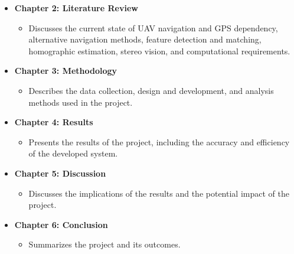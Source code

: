 \begin{itemize}
    \item \textbf{Chapter 2: Literature Review}
    \begin{itemize}
        \item Discusses the current state of UAV navigation and GPS dependency, alternative navigation methods, feature detection and matching, homographic estimation, stereo vision, and computational requirements.
    \end{itemize}
    \item \textbf{Chapter 3: Methodology}
    \begin{itemize}
        \item Describes the data collection, design and development, and analysis methods used in the project.
    \end{itemize}
    \item \textbf{Chapter 4: Results}
    \begin{itemize}
        \item Presents the results of the project, including the accuracy and efficiency of the developed system.
    \end{itemize}
    \item \textbf{Chapter 5: Discussion}
    \begin{itemize}
        \item Discusses the implications of the results and the potential impact of the project.
    \end{itemize}
    \item \textbf{Chapter 6: Conclusion}
    \begin{itemize}
        \item Summarizes the project and its outcomes.
    \end{itemize}
\end{itemize}



